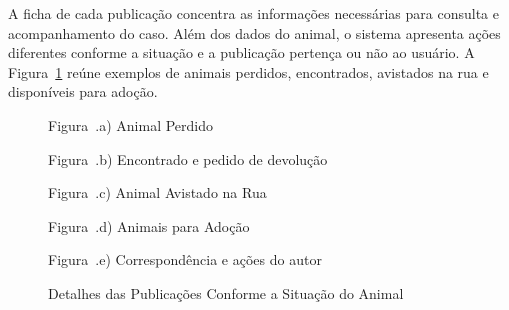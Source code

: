 A ficha de cada publicação concentra as informações necessárias para consulta e acompanhamento do caso. Além dos dados do animal, o sistema apresenta ações diferentes conforme a situação e a publicação pertença ou não ao usuário. A Figura~\ref{fig:tela_detalhes} reúne exemplos de animais perdidos, encontrados, avistados na rua e disponíveis para adoção.

\begin{figure}[H]
    \centering
    \caption{Detalhes das Publicações Conforme a Situação do Animal}
    \label{fig:tela_detalhes}
    \vspace{0.15cm}
    \begin{minipage}[t]{0.31\textwidth}
        \centering
        \par\vspace{0.12cm}
        {\small Figura~\thefigure.a) Animal Perdido}
    \end{minipage}
    \hfill
    \begin{minipage}[t]{0.31\textwidth}
        \centering
        \par\vspace{0.12cm}
        {\small Figura~\thefigure.b) Encontrado e pedido de devolução}
    \end{minipage}
    \hfill
    \begin{minipage}[t]{0.31\textwidth}
        \centering
        \par\vspace{0.12cm}
        {\small Figura~\thefigure.c) Animal Avistado na Rua}
    \end{minipage}
    \par\vspace{0.15cm}
    \begin{minipage}[t]{0.31\textwidth}
        \centering
        \par\vspace{0.12cm}
        {\small Figura~\thefigure.d) Animais para Adoção}
    \end{minipage}
    \hfill
    \begin{minipage}[t]{0.31\textwidth}
        \centering
        \par\vspace{0.12cm}
        {\small Figura~\thefigure.e) Correspondência e ações do autor}
    \end{minipage}
    \par\vspace{0.12cm}
\end{figure}

